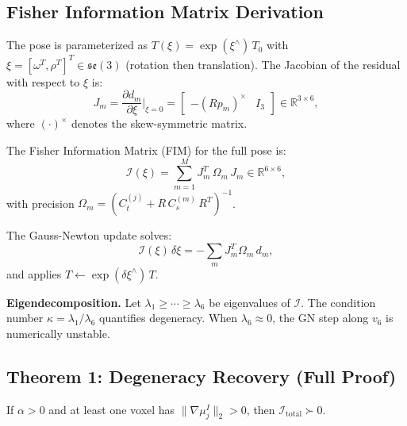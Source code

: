 \documentclass[journal,letterpaper,10pt]{IEEEtran}
\begin{document}
\subsection{Fisher Information Matrix Derivation}\label{app:fim}

The pose is parameterized as $T(\xi) = \exp(\xi^\wedge)\,T_0$
with $\xi = [\omega^T, \rho^T]^T \in \mathfrak{se}(3)$ (rotation then
translation).  The Jacobian of the residual with respect to $\xi$ is:
\begin{equation}
  J_m = \frac{\partial d_m}{\partial \xi}\bigg|_{\xi=0}
  = \begin{bmatrix} -(Rp_m)^\times & I_3 \end{bmatrix} \in \mathbb{R}^{3\times 6},
  \label{eq:app_jacobian}
\end{equation}
where $(\cdot)^\times$ denotes the skew-symmetric matrix.

The Fisher Information Matrix (FIM) for the full pose is:
\begin{equation}
  \mathcal{I}(\xi) = \sum_{m=1}^{M} J_m^T \,\Omega_m\, J_m
  \in \mathbb{R}^{6\times 6},
  \label{eq:app_fim}
\end{equation}
with precision $\Omega_m = (C_t^{(j)} + R\,C_s^{(m)}\,R^T)^{-1}$.

The Gauss-Newton update solves:
\begin{equation}
  \mathcal{I}(\xi)\,\delta\xi = -\sum_{m} J_m^T \Omega_m\, d_m,
  \label{eq:app_gn}
\end{equation}
and applies $T \leftarrow \exp(\delta\xi^\wedge)\,T$.

\textbf{Eigendecomposition.}
Let $\lambda_1 \geq \cdots \geq \lambda_6$ be eigenvalues of $\mathcal{I}$.
The condition number $\kappa = \lambda_1/\lambda_6$ quantifies degeneracy.
When $\lambda_6 \approx 0$, the GN step along $v_6$ is numerically unstable.

\subsection{Theorem 1: Degeneracy Recovery (Full Proof)}\label{app:thm1}

\begin{theorem*}[Restated]
If $\alpha > 0$ and at least one voxel has $\|\nabla\mu_j^I\|_2 > 0$,
then $\mathcal{I}_{\mathrm{total}} \succ 0$.
\end{theorem*}
\end{document}
